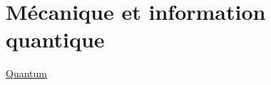 \chapter{M\'ecanique et information quantique}
\href{https://arxiv.org/pdf/1812.09167.pdf}{Quantum}

 
